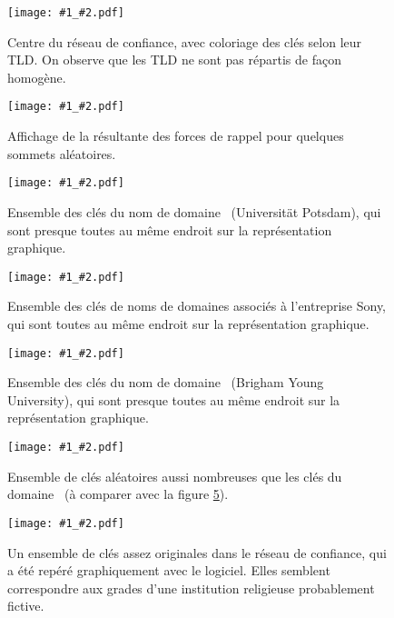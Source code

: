 \documentclass[a4paper]{article}
\newcommand{\img}[3]{
\begin{figure}
\centering
\texttt{[image: \#1\_\#2.pdf]}
\caption{#3}
\label{img_#2}
\end{figure}
}
\begin{document}
\img{images/r2014}{all_colors}{Centre du réseau de confiance, avec coloriage des clés selon leur TLD. On observe que les TLD ne sont pas répartis de façon homogène.}

\img{images/r2014}{accel}{Affichage de la résultante des forces de rappel pour quelques sommets aléatoires.}

\img{images/r1822}{uni_potsdam_de}{Ensemble des clés du nom de domaine \unipotsdamde~(Universität Potsdam), qui sont presque toutes au même endroit sur la représentation graphique.}

\img{images/r1822}{sony}{Ensemble des clés de noms de domaines associés à l'entreprise Sony, qui sont toutes au même endroit sur la représentation graphique.}

\img{images/r1822}{byu_edu}{Ensemble des clés du nom de domaine \byuedu~(Brigham Young University), qui sont presque toutes au même endroit sur la représentation graphique.}

\img{images/r1822}{byu_edu_rand}{Ensemble de clés aléatoires aussi nombreuses que les clés du domaine \byuedu~(à comparer avec la figure \ref{img_byu_edu}).}

\img{images/r2014}{ethereal_convent}{Un ensemble de clés assez originales dans le réseau de confiance, qui a été repéré graphiquement avec le logiciel. Elles semblent correspondre aux grades d'une institution religieuse probablement fictive.}
\end{document}
